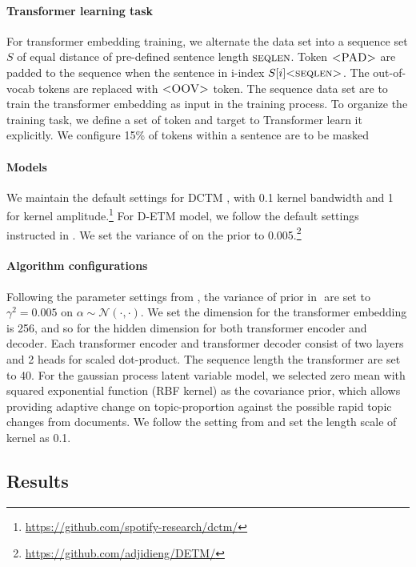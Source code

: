 \paragraph{Transformer learning task}
For transformer embedding training, we alternate the data set into a sequence set $ S $ of equal distance of pre-defined sentence length $ \textsc{seqlen} $. Token $ \textsc{<PAD>} $ are padded to the sequence when the sentence in i-index $ S[i]\textsc{<seqlen>} $. The out-of-vocab tokens are replaced with $ \textsc{<OOV>} $ token. The sequence data set are to train the transformer embedding as input in the training process. To organize the training task, we define a set of token and target to Transformer learn it explicitly. We configure 15\% of tokens within a sentence are to be masked 
\paragraph{Models}
We maintain the default settings for DCTM \cite{tomasi_stochastic_nodate}, with 0.1 kernel bandwidth and 1 for kernel amplitude.\footnote{\url{https://github.com/spotify-research/dctm/}}
For D-ETM model, we follow the default settings instructed in \cite{dieng_dynamic_2019}. We set the variance of  on the prior to 0.005.\footnote{\url{https://github.com/adjidieng/DETM/}}
\paragraph{Algorithm configurations}
Following the parameter settings from \cite{blei_dynamic_2006}, the variance of prior in $  $ are set to $ \gamma^2=0.005 $ on $ \alpha\sim\mathcal{N}(\cdot,\cdot) $.
We set the dimension for the transformer embedding is 256, and so for the hidden dimension for both transformer encoder and decoder. Each transformer encoder and transformer decoder consist of two layers and 2 heads for scaled dot-product. The sequence length the transformer are set to 40.
For the gaussian process latent variable model, we selected zero mean with squared exponential function (RBF kernel) as the covariance prior, which allows providing adaptive change on topic-proportion against the possible rapid topic changes from documents. We follow the setting from \cite{tomasi_stochastic_nodate} and set the length scale of kernel as 0.1.
\subsection{Results}
